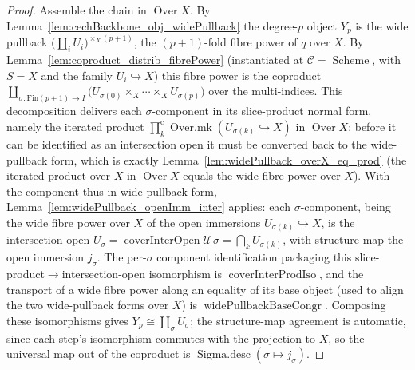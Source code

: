 \begin{proof}
  Assemble the chain in \(\operatorname{Over} X\). By
  Lemma~\ref{lem:cechBackbone_obj_widePullback} the degree-\(p\) object \(Y_p\) is the wide
  pullback \(\bigl(\coprod_i U_i\bigr)^{\times_X (p+1)}\), the \((p+1)\)-fold fibre power of
  \(q\) over \(X\). By Lemma~\ref{lem:coproduct_distrib_fibrePower} (instantiated at
  \(\mathcal{C} = \operatorname{Scheme}\), with \(S = X\) and the family
  \(U_i \hookrightarrow X\)) this fibre power is the coproduct
  \(\coprod_{\sigma : \mathrm{Fin}(p+1) \to I} \bigl(U_{\sigma(0)} \times_X \cdots \times_X
  U_{\sigma(p)}\bigr)\) over the multi-indices. This decomposition delivers each \(\sigma\)-component in
  its slice-product normal form, namely the iterated product
  \(\prod^{\mathrm{c}}_{k}\operatorname{Over.mk}(U_{\sigma(k)} \hookrightarrow X)\) in
  \(\operatorname{Over} X\); before it can be identified as an intersection open it must be converted
  back to the wide-pullback form, which is exactly Lemma~\ref{lem:widePullback_overX_eq_prod} (the
  iterated product over \(X\) in \(\operatorname{Over} X\) equals the wide fibre power over \(X\)). With
  the component thus in wide-pullback form, Lemma~\ref{lem:widePullback_openImm_inter} applies: each
  \(\sigma\)-component, being the wide fibre power over \(X\) of the open immersions
  \(U_{\sigma(k)} \hookrightarrow X\), is the intersection open
  \(U_\sigma = \operatorname{coverInterOpen}\mathcal{U}\,\sigma = \bigcap_k U_{\sigma(k)}\), with
  structure map the open immersion \(j_\sigma\). The per-\(\sigma\) component identification
  packaging this slice-product\(\to\)intersection-open isomorphism is
  \(\operatorname{coverInterProdIso}\), and the transport of a wide fibre power along an
  equality of its base object (used to align the two wide-pullback forms over \(X\)) is
  \(\operatorname{widePullbackBaseCongr}\). Composing these
  isomorphisms gives \(Y_p \cong \coprod_\sigma U_\sigma\); the structure-map agreement is
  automatic, since each step's isomorphism commutes with the projection to \(X\), so the
  universal map out of the coproduct is \(\operatorname{Sigma.desc}(\sigma \mapsto j_\sigma)\).


\end{proof}
